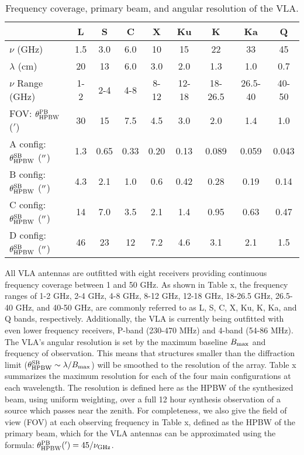 \begin{table}
\begin{center}
\caption[Frequency coverage, primary beam, and angular resolution of the VLA.]
{Frequency coverage, primary beam, and angular resolution of the VLA.}
\begin{tabular}{lcccccccc}
\hline
\hline
\rule{0pt}{2.5ex} &  L& S&C&X&Ku&K&Ka&Q\\
\hline
\rule{0pt}{2.5ex}$\nu$ (GHz)& 1.5& 3.0&6.0&10&15&22&33&45\\
$\lambda$ (cm)& 20& 13&6.0&3.0&2.0&1.3&1.0&0.7\\
$\nu$ Range (GHz)& 1-2& 2-4&4-8&8-12&12-18&18-26.5&26.5-40&40-50\\
FOV: $\theta_{\rm{HPBW}} ^{\rm{PB}}$ ($'$)& 30& 15&7.5 &4.5 &3.0&2.0&1.4&1.0\\
A config: $\theta_{\rm{HPBW}}^{\rm{SB}}$ ($^{\prime\prime}$)&  1.3& 0.65&0.33&0.20&0.13&0.089&0.059&0.043\\
B config: $\theta_{\rm{HPBW}}^{\rm{SB}}$ ($^{\prime\prime}$)&  4.3& 2.1&1.0&0.6&0.42&0.28&0.19&0.14\\
C config: $\theta_{\rm{HPBW}}^{\rm{SB}}$ ($^{\prime\prime}$)&  14& 7.0&3.5&2.1&1.4&0.95&0.63&0.47\\
D config: $\theta_{\rm{HPBW}}^{\rm{SB}}$ ($^{\prime\prime}$)&  46& 23&12&7.2&4.6&3.1&2.1&1.5\\
\hline
\end{tabular}
\label{tab:3.1}
\end{center}
\end{table}
All VLA antennas are outfitted with eight receivers providing continuous frequency coverage between 1 and 50 GHz. As shown in Table x, the frequency ranges of 1-2 GHz, 2-4 GHz, 4-8 GHz, 8-12 GHz, 12-18 GHz, 18-26.5 GHz, 26.5-40 GHz, and 40-50 GHz, are commonly referred to as L, S, C, X, Ku, K, Ka, and Q bands, respectively. Additionally, the VLA is currently being outfitted with even lower frequency receivers, P-band (230-470 MHz) and 4-band (54-86 MHz). The VLA's angular resolution is set by the maximum baseline $B_{\rm{max}}$ and frequency of observation. This means that structures smaller than the diffraction limit ($\theta_{\rm{HPBW}}^{\rm{SB}} \sim \lambda/B_{\rm{max}}$) will be smoothed to the resolution of the array. Table x summarizes the maximum resolution for each of the four main configurations at each wavelength. The resolution is defined here as the HPBW of the synthesized beam, using uniform weighting, over a full 12 hour synthesis observation of a source which passes near the zenith. For completeness, we also give the field of view (FOV) at each observing frequency in Table x, defined as the HPBW  of the primary beam, which for the VLA antennas can be approximated using the formula: $\theta_{\rm{HPBW}} ^{\rm{PB}} (')= 45/\nu _{\rm{GHz}}$. 

